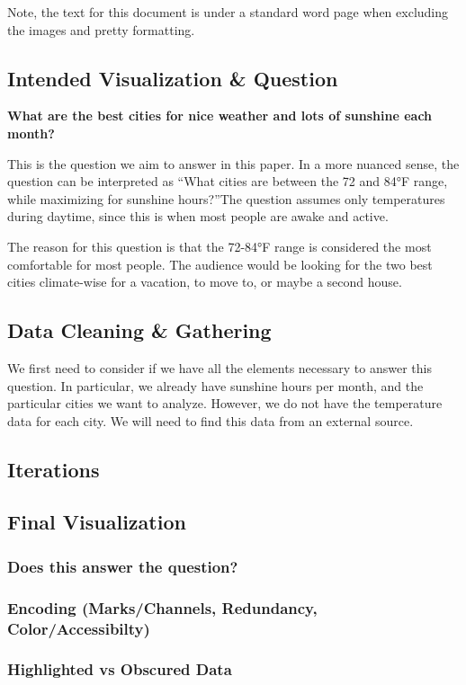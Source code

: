 \documentclass{article}
\begin{document}
\newpage
Note, the text for this document is under a standard word page when excluding the images and pretty formatting. 

\subsection{Intended Visualization \& Question}

\textbf{What are the best cities for nice weather and lots of sunshine each month?}

This is the question we aim to answer in this paper. In a more nuanced sense,
the question can be interpreted as \textquotedblleft What cities are between the 72 and 84°F
range, while maximizing for sunshine hours?\textquotedblright The question assumes only temperatures during daytime, since this 
is when most people are awake and active.

The reason for this question is that the 72-84°F range is considered the most comfortable for most people. 
The audience would be looking for the two best cities climate-wise for a vacation, to move to, or maybe a second house.

\subsection{Data Cleaning \& Gathering}

We first need to consider if we have all the elements necessary to answer this question.
In particular, we already have sunshine hours per month, and the particular cities we want to analyze.
However, we do not have the temperature data for each city. We will need to find this data from an external source.



\subsection{Iterations}

\subsection{Final Visualization}
\subsubsection{Does this answer the question?}
\subsubsection{Encoding (Marks/Channels, Redundancy, Color/Accessibilty)}
\subsubsection{Highlighted vs Obscured Data}



\end{document}
